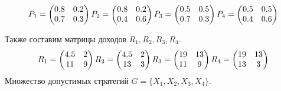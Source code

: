 \begin{equation*}
P_1=\begin{pmatrix}
0.8 & 0.2\\
0.7 & 0.3
\end{pmatrix}\\
P_2=\begin{pmatrix}
0.8 & 0.2\\
0.4 & 0.6
\end{pmatrix}\\
P_3=\begin{pmatrix}
0.5 & 0.5\\
0.7 & 0.3
\end{pmatrix}\\
P_4=\begin{pmatrix}
0.5 & 0.5\\
0.4 & 0.6
\end{pmatrix}
\end{equation*}
%
%
%


Также составим матрицы доходов $R_1, R_2, R_3, R_4$.
\begin{equation*}
R_1=\begin{pmatrix}
4.5 & 2\\
11 & 9
\end{pmatrix}\\
R_2=\begin{pmatrix}
4.5 & 2\\
13 & 3
\end{pmatrix}\\
R_3=\begin{pmatrix}
19 & 13\\
11 & 9
\end{pmatrix}\\
R_4=\begin{pmatrix}
19 & 13\\
13 & 3
\end{pmatrix}
\end{equation*}
Множество допустимых стратегий $G=\{X_1, X_2, X_3, X_4\}$.
